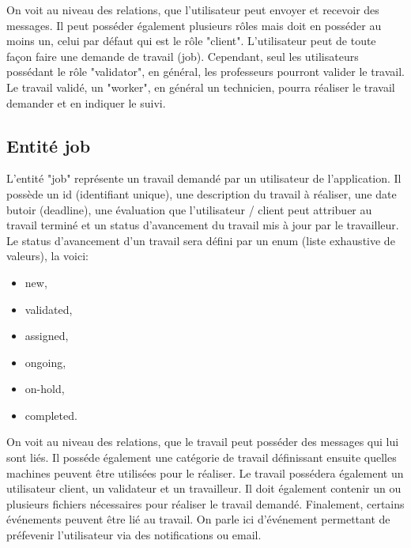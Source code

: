 \documentclass[
    iai, %
    il, %
]{heig-tb}
\begin{document}
On voit au niveau des relations, que l'utilisateur peut envoyer et recevoir des messages.\newline
Il peut posséder également plusieurs rôles mais doit en posséder au moins un, celui par défaut qui est le rôle "client".\newline
L'utilisateur peut de toute façon faire une demande de travail (job). Cependant, seul les utilisateurs possédant le rôle "validator", en général, les professeurs pourront valider le travail.\newline
Le travail validé, un "worker", en général un technicien, pourra réaliser le travail demander et en indiquer le suivi.

\subsection{Entité job}
L'entité "job" représente un travail demandé par un utilisateur de l'application.\newline
Il possède un id (identifiant unique), une description du travail à réaliser, une date butoir (deadline), une évaluation que l'utilisateur / client peut attribuer au travail terminé et un status d'avancement du travail mis à jour par le travailleur.\newline
Le status d'avancement d'un travail sera défini par un enum (liste exhaustive de valeurs), la voici:
\begin{itemize}
    \item new,
    \item validated,
    \item assigned,
    \item ongoing,
    \item on-hold,
    \item completed.
\end{itemize}

On voit au niveau des relations, que le travail peut posséder des messages qui lui sont liés.\newline
Il posséde également une catégorie de travail définissant ensuite quelles machines peuvent être utilisées pour le réaliser.\newline
Le travail possédera également un utilisateur client, un validateur et un travailleur.\newline
Il doit également contenir un ou plusieurs fichiers nécessaires pour réaliser le travail demandé.\newline
Finalement, certains événements peuvent être lié au travail. On parle ici d'événement permettant de préfevenir l'utilisateur via des notifications ou email.
\end{document}

